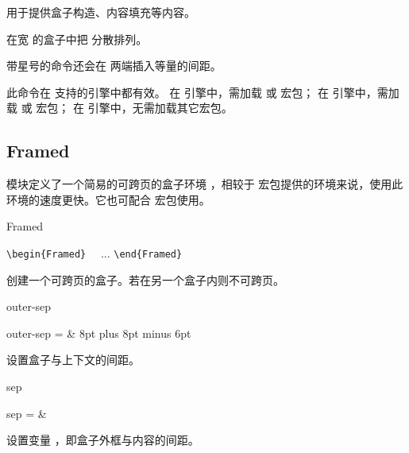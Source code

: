 \documentclass[twoside]{book}
\def\xampletext{\par}
\def\xampleprint{\xamplecode \xampleline \xampletext}
\begin{document}
 用于提供盒子构造、内容填充等内容。

\begin{function}{\spreadtext}
  \begin{syntax}
    \V\spreadtext   {} 
    \V\spreadtext *  
  \end{syntax}
在宽  的盒子中把  分散排列。

带星号的命令还会在  两端插入等量的间距。

此命令在 \WhuLaTeX 支持的引擎中都有效。
在 \LuaLaTeX 引擎中，需加载  或  宏包；
在 \XeLaTeX 引擎中，需加载  或  宏包；
在 \upLaTeX 引擎中，无需加载其它宏包。
\end{function}

\begin{xample}

\stopxamplecode
\xampleprint
\end{xample}

\subsection{Framed}

 模块定义了一个简易的可跨页的盒子环境 ，相较于 
 宏包提供的环境来说，使用此环境的速度更快。它也可配合 
宏包使用。

\begin{function}[type=environment]{Framed}
  \begin{syntax}
    \verb|\begin{Framed}| 
    ~~... 
    \verb|\end{Framed}|
  \end{syntax}
创建一个可跨页的盒子。若在另一个盒子内则不可跨页。
\end{function}

\begin{keyval}[path=frame]{outer-sep}
  \begin{syntax}
    outer-sep =  & 8pt plus 8pt minus 6pt 
  \end{syntax}
设置盒子与上下文的间距。
\end{keyval}

\begin{keyval}[path=frame]{sep}
  \begin{syntax}
    sep =  & \V{3\fboxsep}
  \end{syntax}
设置变量 ，即盒子外框与内容的间距。
\end{keyval}
\end{document}
